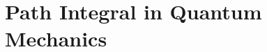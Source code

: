 \documentclass[11pt,twoside]{report}
\begin{document}
\setcounter{chapter}{1}

\chapter{Path Integral in Quantum Mechanics}
\label{chap:lec1}

\end{document}
